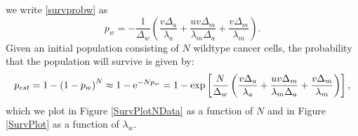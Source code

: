 \documentclass[11pt,a4paper]{article}
\newcommand{\e}{{\rm e}}
\begin{document}
we write \eqref{survprobw} as
\begin{equation}\label{survprobwapprox}
p_w=-\frac{1}{\Delta_w}\left(\frac{v\Delta_a}{\lambda_a}+\frac{uv\Delta_m}{\lambda_m\Delta_a}+\frac{v\Delta_m}{\lambda_m}\right).
\end{equation}
Given an initial population consisting of $N$ wildtype cancer cells, the probability that the population will survive is given by: 
\begin{align}
p_{est}=1-\left(1-p_w\right)^N\approx 1-\e^{-Np_w}=1-\exp\left[\frac{N}{\Delta_w}\left(\frac{v\Delta_a}{\lambda_a}+\frac{uv\Delta_m}{\lambda_m\Delta_a}+\frac{v\Delta_m}{\lambda_m}\right)\right],
\end{align}
which we plot in Figure \ref{SurvPlotNData} as a function of $N$ and in Figure \ref{SurvPlot} as a function of $\lambda_w$. 
\end{document}
